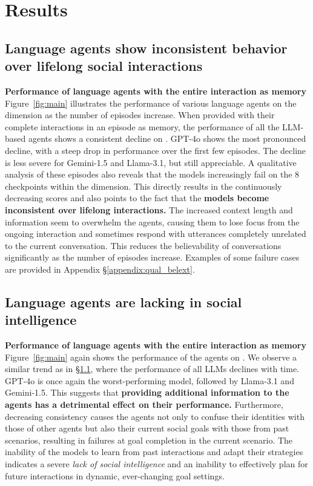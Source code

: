 \section{Results}
\label{sec:results}

\subsection{Language agents show inconsistent behavior over lifelong social interactions}
\label{sec:results:rq1}

\textbf{Performance of language agents with the entire interaction as memory} \quad Figure~\ref{fig:main} illustrates the performance of various language agents on the \believabilityFull dimension as the number of episodes increase. When provided with their complete interactions in an episode as memory, the performance of all the LLM-based agents shows a consistent decline on \believability. GPT-4o shows the most pronounced decline, with a steep drop in performance over the first few episodes. The decline is less severe for Gemini-1.5 and Llama-3.1, but still appreciable. A qualitative analysis of these episodes also reveals that the models increasingly fail on the 8 checkpoints within the \believabilityextended dimension. This directly results in the continuously decreasing \believability scores and also points to the fact that the \textbf{models become inconsistent over lifelong interactions.} The increased context length and information seem to overwhelm the agents, causing them to lose focus from the ongoing interaction and sometimes respond with utterances completely unrelated to the current conversation. This reduces the believability of conversations significantly as the number of episodes increase. Examples of some failure cases are provided in Appendix \S \ref{appendix:qual_belext}.

\subsection{Language agents are lacking in social intelligence}
\label{sec:results:rq2} 
\textbf{Performance of language agents with the entire interaction as memory} \quad Figure~\ref{fig:main} again shows the performance of the agents on \goalcompletionFull. We observe a similar trend as in \S \ref{sec:results:rq1}, where the performance of all LLMs declines with time. GPT-4o is once again the worst-performing model, followed by Llama-3.1 and Gemini-1.5. This suggests that \textbf{providing additional information to the agents has a detrimental effect on their performance.} Furthermore, decreasing consistency causes the agents not only to confuse their identities with those of other agents but also their current social goals with those from past scenarios, resulting in failures at goal completion in the current scenario. The inability of the models to learn from past interactions and adapt their strategies indicates a severe \textit{lack of social intelligence} and an inability to effectively plan for future interactions in dynamic, ever-changing goal settings.

